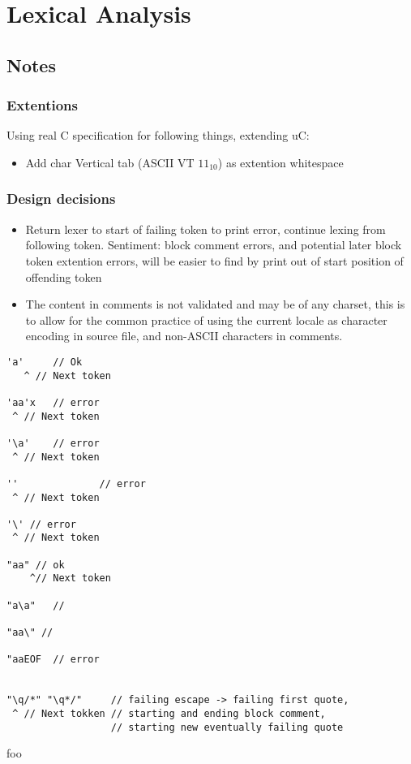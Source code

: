 
\section{Lexical Analysis}
\label{sec:lexical_analysis}

\subsection{Notes}
\subsubsection{Extentions}
Using real C specification for following things, extending uC:
\begin{itemize}
	\item Add char Vertical tab (ASCII VT $11_{10}$) as extention whitespace
\end{itemize}

\subsubsection{Design decisions}
\begin{itemize}
	\item Return lexer to start of failing token to print error, continue lexing from following token.
	Sentiment: block comment errors, and potential later block token extention errors, will be easier to find by print out of start position of offending token
	\item The content in comments is not validated and may be of any charset, this is to allow for the common practice of using the current locale as character encoding in source file, and non-ASCII characters in comments.
\end{itemize}

\begin{verbatim}
'a'     // Ok
   ^ // Next token

'aa'x   // error
 ^ // Next token

'\a'    // error
 ^ // Next token

''              // error
 ^ // Next token

'\' // error
 ^ // Next token

"aa" // ok
    ^// Next token

"a\a"   //

"aa\" //

"aaEOF  // error


"\q/*" "\q*/"     // failing escape -> failing first quote,
 ^ // Next tokken // starting and ending block comment,
                  // starting new eventually failing quote

\end{verbatim}
foo \cite{lexical_scanning_in_go}
